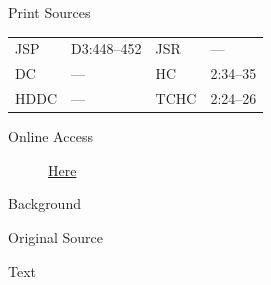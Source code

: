 			\begin{description}
					\item[Print Sources]
				\end{description}

					\begin{tabular}{p{0.5in}p{1in}p{0.5in}p{1in}}
					JSP	 	& D3:448--452		& JSR 		& --- \\
					DC	 	& --- 		& HC 		& 2:34--35 \\
					HDDC 	& ---		& TCHC 		& 2:24--26 \\
					\end{tabular}
				
				\begin{description}
					\item[Online Access] \href{https://www.josephsmithpapers.org/paper-summary/minutes-20-february-1834/1}{Here}
				\end{description}
				
				\begin{description}
					\item[Background]
				\end{description}
				
				
				\begin{description}
					\item[Original Source]
				\end{description}
				
				
				\begin{description}
					\item[Text]
				\end{description}
				
